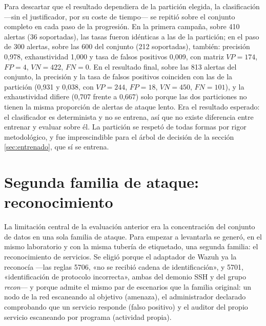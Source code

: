 Para descartar que el resultado dependiera de la partición elegida, la clasificación ---sin el
justificador, por su coste de tiempo--- se repitió sobre el conjunto completo en cada paso de la
progresión. En la primera campaña, sobre 410 alertas (36 soportadas), las tasas fueron idénticas a
las de la partición; en el paso de 300 alertas, sobre las 600 del conjunto (212 soportadas),
también: precisión 0,978, exhaustividad 1,000 y tasa de falsos positivos 0,009, con matriz
$VP=174$, $FP=4$, $VN=422$, $FN=0$. En el resultado final, sobre las 813 alertas del conjunto, la
precisión y la tasa de falsos positivos coinciden con las de la partición (0,931 y 0,038, con
$VP=244$, $FP=18$, $VN=450$, $FN=101$), y la exhaustividad difiere (0,707 frente a 0,667) solo porque
las dos particiones no tienen la misma proporción de alertas de ataque lento. Era el resultado
esperado: el clasificador es determinista y
no se entrena, así que no existe diferencia entre entrenar y evaluar sobre él. La partición se
respetó de todas formas por rigor metodológico, y fue imprescindible para el árbol de decisión de
la sección \ref{sec:entrenado}, que sí se entrena.

\section{Segunda familia de ataque: reconocimiento}
\label{sec:segunda-familia}

La limitación central de la evaluación anterior era la concentración del conjunto de datos en una
sola familia de ataque. Para empezar a levantarla se generó, en el mismo laboratorio y con la misma
tubería de etiquetado, una segunda familia: el reconocimiento de servicios. Se eligió porque el
adaptador de Wazuh ya la reconocía ---las reglas 5706, «no se recibió cadena de identificación», y
5701, «identificación de protocolo incorrecta», ambas del demonio SSH y del grupo \emph{recon}--- y
porque admite el mismo par de escenarios que la familia original: un nodo de la red escaneando al
objetivo (amenaza), el administrador declarado comprobando que un servicio responde (falso
positivo) y el auditor del propio servicio escaneando por programa (actividad propia).

